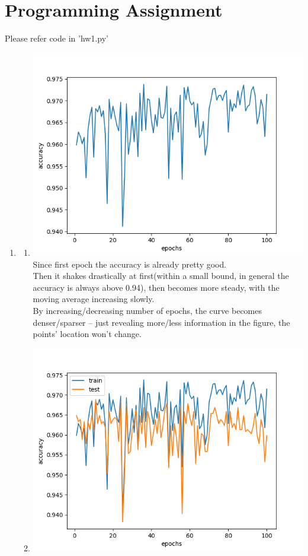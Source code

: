 \documentclass[11pt, oneside]{article}   	%
\begin{document}
\section{Programming Assignment}
Please refer code in 'hw1.py'
\begin{enumerate}
\item	%
  \begin{enumerate}
  \item	%
    \includegraphics[width=15cm]{2_1a.png}\\
    Since first epoch the accuracy is already pretty good.\\
    Then it shakes drastically at first(within a small bound, in general the accuracy is always above 0.94), then becomes more steady, with the moving average increasing slowly.\\
    By increasing/decreasing number of epochs, the curve becomes denser/sparser -- just revealing more/less information in the figure, the points' location won't change.
  \item	%
    \includegraphics[width=15cm]{2_1b.png}\\

\end{enumerate}
\end{enumerate}
\end{document}
